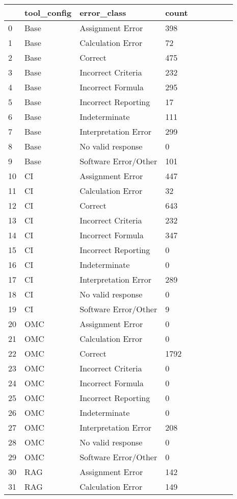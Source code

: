 \begin{tabular}{|l|l|l|l|l|l|l|l|l|}
\toprule
 & tool\_config & error\_class & count \\
\midrule
0 & Base & Assignment Error & 398 \\
1 & Base & Calculation Error & 72 \\
2 & Base & Correct & 475 \\
3 & Base & Incorrect Criteria & 232 \\
4 & Base & Incorrect Formula & 295 \\
5 & Base & Incorrect Reporting & 17 \\
6 & Base & Indeterminate & 111 \\
7 & Base & Interpretation Error & 299 \\
8 & Base & No valid response & 0 \\
9 & Base & Software Error/Other & 101 \\
10 & CI & Assignment Error & 447 \\
11 & CI & Calculation Error & 32 \\
12 & CI & Correct & 643 \\
13 & CI & Incorrect Criteria & 232 \\
14 & CI & Incorrect Formula & 347 \\
15 & CI & Incorrect Reporting & 0 \\
16 & CI & Indeterminate & 0 \\
17 & CI & Interpretation Error & 289 \\
18 & CI & No valid response & 0 \\
19 & CI & Software Error/Other & 9 \\
20 & OMC & Assignment Error & 0 \\
21 & OMC & Calculation Error & 0 \\
22 & OMC & Correct & 1792 \\
23 & OMC & Incorrect Criteria & 0 \\
24 & OMC & Incorrect Formula & 0 \\
25 & OMC & Incorrect Reporting & 0 \\
26 & OMC & Indeterminate & 0 \\
27 & OMC & Interpretation Error & 208 \\
28 & OMC & No valid response & 0 \\
29 & OMC & Software Error/Other & 0 \\
30 & RAG & Assignment Error & 142 \\
31 & RAG & Calculation Error & 149 \\

\end{tabular}
